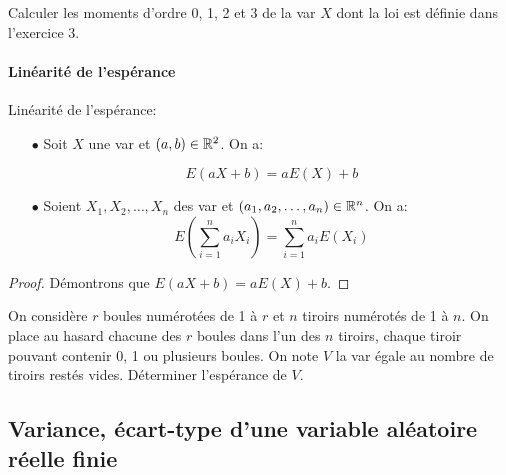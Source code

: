 \documentclass[a4paper, 11pt]{article}
\begin{document}
{\footnotesize \begin{exercice} 
Calculer les moments d'ordre 0, 1, 2 et 3 de la var $X$ dont la loi est d\'efinie dans l'exercice 3.
\end{exercice}}\vsec\vsec






\paragraph{Lin\'earit\'e de l'esp\'erance}


 {  

\begin{prop} Lin\'earit\'e de l'esp\'erance:
\begin{itemize}
\item[$\bullet$] Soit $X$ une var et $(a,b)\in\mathbb{R}^2$. On a:

$$E(aX+b) =aE(X)+b$$
\item[$\bullet$] Soient $X_1,X_2,\dots,X_n$ des var et $(a_1,a_2,\dots,a_n)\in\mathbb{R}^n$. On a:
$$E(\sum_{i=1}^n a_i X_i) = \sum_{i=1}^n a_iE(X_i) $$

\end{itemize}
\end{prop}
 
}

\begin{proof}
D\'emontrons que $E(aX+b)=aE(X)+b$.


\end{proof}


{\footnotesize \begin{exercice} On consid\`ere $r$ boules num\'erot\'ees de 1 \`a $r$ et $n$ tiroirs num\'erot\'es de 1 \`a $n$. On place au hasard chacune des $r$ boules dans l'un des $n$ tiroirs, chaque tiroir pouvant contenir 0, 1 ou plusieurs boules. On note $V$ la var \'egale au nombre de tiroirs rest\'es vides. D\'eterminer l'esp\'erance de $V$.
\end{exercice}}



\subsection{Variance, \'ecart-type d'une variable al\'eatoire r\'eelle finie}


\end{document}
